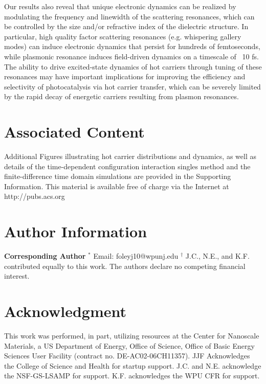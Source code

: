 \documentclass[journal=jpclcd,manuscript=article]{achemso}
\begin{document}
Our results also reveal that 
unique electronic dynamics can be realized by modulating the frequency and linewidth of the scattering resonances, which 
can be controlled by the size and/or refractive index of the dielectric structure.  In particular, high quality 
factor scattering resonances (e.g. whispering gallery modes) can induce electronic dynamics that persist for hundreds of 
femtoseconds, while plasmonic resonance induces field-driven dynamics on a timescale of ~10 fs.  The ability to 
drive excited-state dynamics of hot carriers through tuning of these resonances may have important implications 
for improving the efficiency and selectivity of photocatalysis via hot carrier transfer, which can be 
severely limited by the rapid decay of energetic carriers resulting from plasmon resonances.

\section{Associated Content}
Additional Figures illustrating hot carrier distributions and dynamics, as well as details of the time-dependent
configuration interaction singles method and the finite-difference time domain simulations are provided in the Supporting 
Information.  This material is available free of charge via the Internet at http://pubs.acs.org

\section{Author Information}
{\bf Corresponding Author}
$^*$ Email: foleyj10@wpunj.edu
\newline
$^{\dagger}$  J.C., N.E., and K.F. contributed equally to this work.
\newline
The authors declare no competing financial interest.

\section{Acknowledgment}
This work was performed, in part, utilizing resources at
the Center for Nanoscale Materials, a US Department of Energy, Office of Science, Office of
Basic Energy Sciences User Facility (contract no. DE-AC02-06CH11357).
JJF Acknowledges the College of Science and Health for startup support.
J.C. and N.E. acknowledge the NSF-GS-LSAMP for support.  K.F. acknowledges the WPU CFR for support.


 
\end{document}
